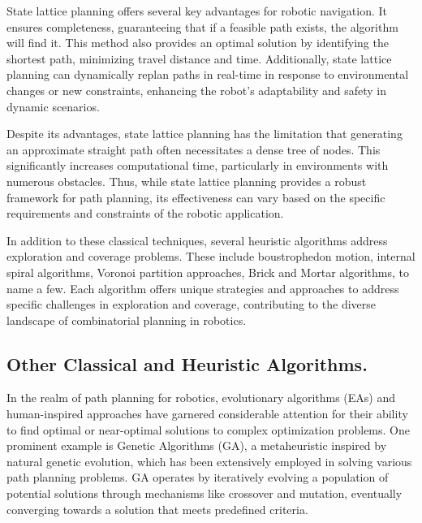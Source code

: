 \vspace{3mm}

State lattice planning offers several key advantages for robotic navigation. It ensures completeness, guaranteeing that if a feasible path exists, the algorithm will find it. This method also provides an optimal solution by identifying the shortest path, minimizing travel distance and time. Additionally, state lattice planning can dynamically replan paths in real-time in response to environmental changes or new constraints, enhancing the robot’s adaptability and safety in dynamic scenarios. 

\vspace{3mm}

Despite its advantages, state lattice planning has the limitation that generating an approximate straight path often necessitates a dense tree of nodes. This significantly increases computational time, particularly in environments with numerous obstacles. Thus, while state lattice planning provides a robust framework for path planning, its effectiveness can vary based on the specific requirements and constraints of the robotic application.

\vspace{3mm}


In addition to these classical techniques, several heuristic algorithms address exploration and coverage problems. These include boustrophedon motion, internal spiral algorithms, Voronoi partition approaches, Brick and Mortar algorithms, to name a few. Each algorithm offers unique strategies and approaches to address specific challenges in exploration and coverage, contributing to the diverse landscape of combinatorial planning in robotics.



\subsection{Other Classical and Heuristic Algorithms.}

In the realm of path planning for robotics, evolutionary algorithms (EAs) and human-inspired approaches have garnered considerable attention for their ability to find optimal or near-optimal solutions to complex optimization problems. One prominent example is Genetic Algorithms (GA), a metaheuristic inspired by natural genetic evolution, which has been extensively employed in solving various path planning problems. GA operates by iteratively evolving a population of potential solutions through mechanisms like crossover and mutation, eventually converging towards a solution that meets predefined criteria.

